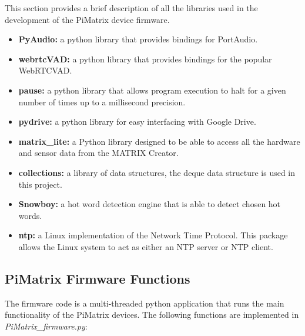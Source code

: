\documentclass[hidelinks,12pt]{report} %
\begin{document}
This section provides a brief description of all the libraries used in the development of the PiMatrix device firmware.

	\begin{itemize}
		\item{\textbf{PyAudio\cite{31}: }}
		a python library that provides bindings for PortAudio.
		\item{\textbf{webrtcVAD\cite{32}: }}
		a python library that provides bindings for the popular WebRTCVAD.
		\item{\textbf{pause\cite{33}: }}
		a python library that allows program execution to halt for a given number of times up to a millisecond precision.
		\item{\textbf{pydrive\cite{34}: }}
		a python library for easy interfacing with Google Drive.
		\item{\textbf{matrix\_lite\cite{35}: }}
		a Python library designed to be able to access all the hardware and sensor data from the MATRIX Creator.  
		\item{\textbf{collections\cite{36}: }}
		a library of data structures, the deque data structure is used in this project. 
		\item{\textbf{Snowboy\cite{37}: }}
		a hot word detection engine that is able to detect chosen hot words. 
		\item{\textbf{ntp\cite{28}: }}
		a Linux implementation of the Network Time Protocol. This package allows the Linux system to act as either an NTP server or NTP client. 

		
	\end{itemize}

\subsection{PiMatrix Firmware Functions}

The firmware code is a multi-threaded python application that runs the main functionality of the PiMatrix devices. The following functions are implemented in \textit{PiMatrix\_firmware.py}:
\end{document}
